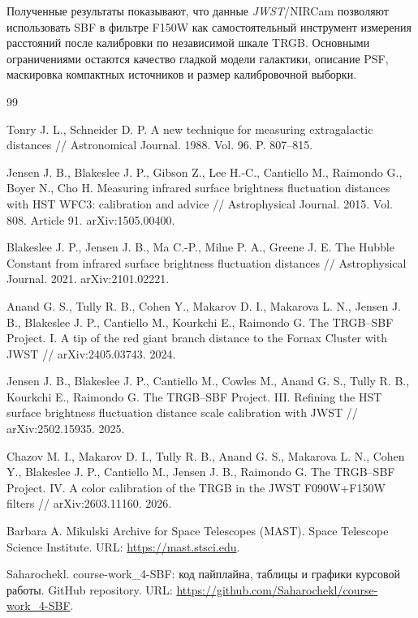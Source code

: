 \documentclass[12pt,a4paper]{article}
\begin{document}
Полученные результаты показывают, что данные \textit{JWST}/NIRCam позволяют использовать SBF в фильтре F150W как самостоятельный инструмент измерения расстояний после калибровки по независимой шкале TRGB. Основными ограничениями остаются качество гладкой модели галактики, описание PSF, маскировка компактных источников и размер калибровочной выборки.

\begin{thebibliography}{99}

Tonry J. L., Schneider D. P. A new technique for measuring extragalactic distances // Astronomical Journal. 1988. Vol. 96. P. 807--815.

Jensen J. B., Blakeslee J. P., Gibson Z., Lee H.-C., Cantiello M., Raimondo G., Boyer N., Cho H. Measuring infrared surface brightness fluctuation distances with HST WFC3: calibration and advice // Astrophysical Journal. 2015. Vol. 808. Article 91. arXiv:1505.00400.

Blakeslee J. P., Jensen J. B., Ma C.-P., Milne P. A., Greene J. E. The Hubble Constant from infrared surface brightness fluctuation distances // Astrophysical Journal. 2021. arXiv:2101.02221.

Anand G. S., Tully R. B., Cohen Y., Makarov D. I., Makarova L. N., Jensen J. B., Blakeslee J. P., Cantiello M., Kourkchi E., Raimondo G. The TRGB--SBF Project. I. A tip of the red giant branch distance to the Fornax Cluster with JWST // arXiv:2405.03743. 2024.

Jensen J. B., Blakeslee J. P., Cantiello M., Cowles M., Anand G. S., Tully R. B., Kourkchi E., Raimondo G. The TRGB--SBF Project. III. Refining the HST surface brightness fluctuation distance scale calibration with JWST // arXiv:2502.15935. 2025.

Chazov M. I., Makarov D. I., Tully R. B., Anand G. S., Makarova L. N., Cohen Y., Blakeslee J. P., Cantiello M., Jensen J. B., Raimondo G. The TRGB--SBF Project. IV. A color calibration of the TRGB in the JWST F090W+F150W filters // arXiv:2603.11160. 2026.

Barbara A. Mikulski Archive for Space Telescopes (MAST). Space Telescope Science Institute. URL: \url{https://mast.stsci.edu}.

Saharochekl. course-work\_4-SBF: код пайплайна, таблицы и графики курсовой работы. GitHub repository. URL: \url{https://github.com/Saharochekl/course-work_4-SBF}.

\end{thebibliography}
\end{document}

